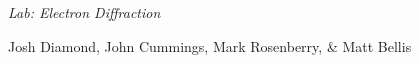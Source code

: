 {\LARGE {\em \noindent Lab: Electron Diffraction}}

\large{\noindent Josh Diamond, John Cummings, Mark Rosenberry, \& Matt Bellis}

